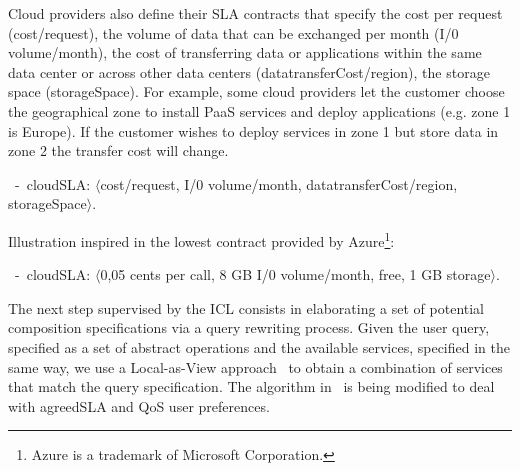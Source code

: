 Cloud providers also define their SLA contracts that specify the cost per request ({cost/request}), the volume of data that can be exchanged per month ({I/0 volume/month}), the cost of transferring data or applications within the same data center or across other data centers ({datatransferCost/region}), the storage space ({storageSpace}). For example, some cloud providers let the customer  choose the geographical zone to install PaaS services and deploy applications (e.g. zone 1 is Europe). If the customer wishes to deploy services in zone 1 but store data in zone 2 the transfer cost will change.

\begin{trivlist}\sf\footnotesize
 \item[~-~cloudSLA:]  $\langle$cost/request, I/0 volume/month, datatransferCost/region, storageSpace$\rangle$.
 \end{trivlist}
 
Illustration inspired in the lowest contract provided by Azure\footnote{Azure is a trademark of Microsoft Corporation.}: 
 \begin{trivlist}\sf\footnotesize
\item[~-~cloudSLA:]  $\langle$0,05 cents per call, 8 GB I/0 volume/month, free, 1 GB storage$\rangle$. 
\end{trivlist}


 


The next step supervised by the ICL consists in elaborating a set of potential composition specifications via a query rewriting process. Given the user query, specified as a set of abstract operations and the available services, specified in the same way, we use a Local-as-View approach~\cite{CostaAMR13} to obtain a combination of services that match the query specification.
The algorithm in~\cite{CostaAMR13} is being modified to deal with agreedSLA and QoS user preferences.

 

